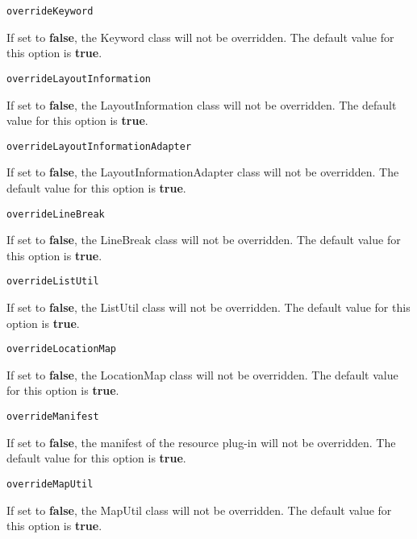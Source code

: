 \noindent\texttt{overrideKeyword}
\begin{myindentpar}{1cm}
If set to \textbf{false}, the Keyword class will not be overridden. The default value for this option is \textbf{true}.
\end{myindentpar}

\noindent\texttt{overrideLayoutInformation}
\begin{myindentpar}{1cm}
If set to \textbf{false}, the LayoutInformation class will not be overridden. The default value for this option is \textbf{true}.
\end{myindentpar}

\noindent\texttt{overrideLayoutInformationAdapter}
\begin{myindentpar}{1cm}
If set to \textbf{false}, the LayoutInformationAdapter class will not be overridden. The default value for this option is \textbf{true}.
\end{myindentpar}

\noindent\texttt{overrideLineBreak}
\begin{myindentpar}{1cm}
If set to \textbf{false}, the LineBreak class will not be overridden. The default value for this option is \textbf{true}.
\end{myindentpar}

\noindent\texttt{overrideListUtil}
\begin{myindentpar}{1cm}
If set to \textbf{false}, the ListUtil class will not be overridden. The default value for this option is \textbf{true}.
\end{myindentpar}

\noindent\texttt{overrideLocationMap}
\begin{myindentpar}{1cm}
If set to \textbf{false}, the LocationMap class will not be overridden. The default value for this option is \textbf{true}.
\end{myindentpar}

\noindent\texttt{overrideManifest}
\begin{myindentpar}{1cm}
If set to \textbf{false}, the manifest of the resource plug-in will not be overridden. The default value for this option is \textbf{true}.
\end{myindentpar}

\noindent\texttt{overrideMapUtil}
\begin{myindentpar}{1cm}
If set to \textbf{false}, the MapUtil class will not be overridden. The default value for this option is \textbf{true}.
\end{myindentpar}

